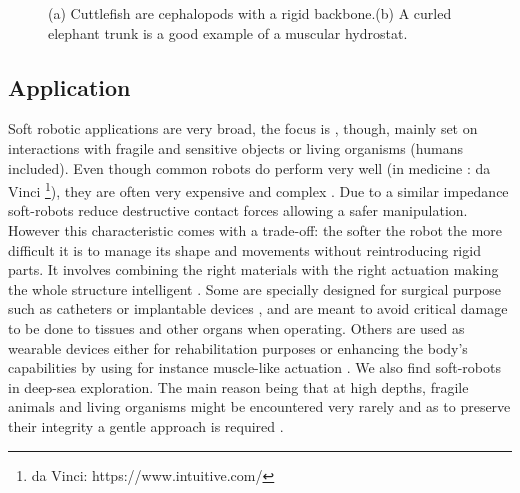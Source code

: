 \begin{figure}[ht]
\centering
{}\quad
{}
\caption[Inspiration]{\label{f:Inspiration}(a) Cuttlefish are cephalopods with a rigid backbone.(b) A curled elephant trunk is a good example of a muscular hydrostat.}
\end{figure}


\subsection{Application}
\label{s:Application}
Soft robotic applications are very broad, the focus is , though,  mainly set on interactions with fragile and sensitive objects or living organisms (humans included). Even though common robots do perform very well (in medicine : da Vinci \footnote{da Vinci: https://www.intuitive.com/}), they are often very expensive and complex \cite{polygerinos2017soft}. Due to a similar impedance soft-robots reduce destructive contact forces allowing a safer manipulation. However this characteristic comes with a trade-off: the softer the robot the more difficult it is to manage its shape and  movements without reintroducing rigid parts. It involves combining the right materials \cite{polygerinos2017soft} with the right actuation making the whole structure intelligent \cite{rus2015design}. Some are specially designed for surgical purpose such as catheters or implantable devices \cite{levering2014soft, polygerinos2017soft}, and are meant to avoid critical damage to be done to tissues and other organs when operating. Others are used as wearable devices either for rehabilitation purposes or enhancing the body's capabilities by using for instance muscle-like actuation \cite{park2014design, polygerinos2017soft}. We also find soft-robots in deep-sea exploration. The main reason being that at high depths, fragile animals and living organisms might be encountered very rarely and as to preserve their integrity a gentle approach is required \cite{Galloway2016, Kurumaya2018}.

